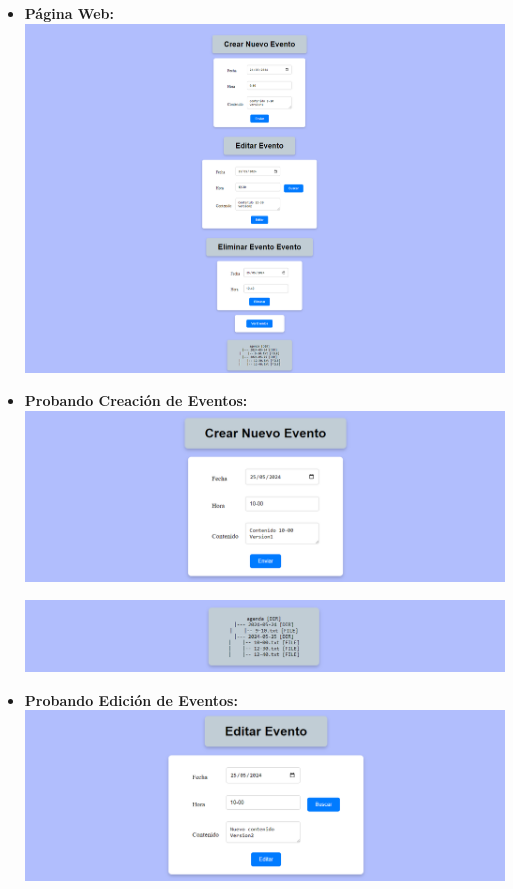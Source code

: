 \documentclass{article}
\begin{document}
\begin{itemize}
\item \textbf{Página Web:} \\



\includegraphics[width=\textwidth]{img/8.png}
\item \textbf{Probando Creación de Eventos:} \\



\includegraphics[width=\textwidth]{img/9.png}


\includegraphics[width=\textwidth]{img/10.png}
\item \textbf{Probando Edición de Eventos:} \\



\includegraphics[width=\textwidth]{img/11.png}



\end{itemize}
\end{document}
